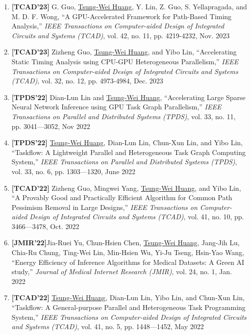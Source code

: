 \documentclass[A4,11pt]{article}
\begin{document}
\begin{enumerate}
  \item \textbf{[TCAD'23]} G. Guo, \underline{Tsung-Wei Huang}, Y. Lin, Z. Guo, S. Yellapragada, and M. D. F. Wong, ``A GPU-Accelerated Framework for Path-Based Timing Analysis,'' \textit{IEEE Transactions on Computer-aided Design of Integrated Circuits and Systems (TCAD)}, vol. 42, no. 11, pp. 4219-4232, Nov. 2023

  \item \textbf{[TCAD'23]} Zizheng Guo, \underline{Tsung-Wei Huang}, and Yibo Lin, ``Accelerating Static Timing Analysis using CPU-GPU Heterogeneous Parallelism,'' \textit{IEEE Transactions on Computer-aided Design of Integrated Circuits and Systems (TCAD)}, vol. 32, no. 12, pp. 4973-4984, Dec. 2023

  \item \textbf{[TPDS'22]} Dian-Lun Lin and \underline{Tsung-Wei Huang}, ``Accelerating Large Sparse Neural Network Inference using GPU Task Graph Parallelism,'' \textit{IEEE Transactions on Parallel and Distributed Systems (TPDS)}, vol. 33, no. 11, pp. 3041—3052, Nov 2022

  \item \textbf{[TPDS'22]} \underline{Tsung-Wei Huang}, Dian-Lun Lin, Chun-Xun Lin, and Yibo Lin, ``Taskflow: A Lightweight Parallel and Heterogeneous Task Graph Computing System,'' \textit{IEEE Transactions on Parallel and Distributed Systems (TPDS)}, vol. 33, no. 6, pp. 1303—1320, June 2022

  \item \textbf{[TCAD'22]} Zizheng Guo, Mingwei Yang, \underline{Tsung-Wei Huang}, and Yibo Lin, ``A Provably Good and Practically Efficient Algorithm for Common Path Pessimism Removal in Large Designs,'' \textit{IEEE Transactions on Computer-aided Design of Integrated Circuits and Systems (TCAD)}, vol. 41, no. 10, pp. 3466—3478, Oct. 2022

  \item \textbf{[JMIR'22]}Jia-Ruei Yu, Chun-Hsien Chen, \underline{Tsung-Wei Huang}, Jang-Jih Lu, Chia-Ru Chung, Ting-Wei Lin, Min-Hsien Wu, Yi-Ju Tseng, Hsin-Yao Wang, ``Energy Efficiency of Inference Algorithms for Medical Datasets: A Green AI study,'' \textit{Journal of Medical Internet Research (JMIR)}, vol. 24, no. 1, Jan. 2022

  \item \textbf{[TCAD'22]} \underline{Tsung-Wei Huang}, Dian-Lun Lin, Yibo Lin, and Chun-Xun Lin, ``Taskflow: A General-purpose Parallel and Heterogeneous Task Programming System,'' \textit{IEEE Transactions on Computer-aided Design of Integrated Circuits and Systems (TCAD)}, vol. 41, no. 5, pp. 1448—1452, May 2022


\end{enumerate}
\end{document}
